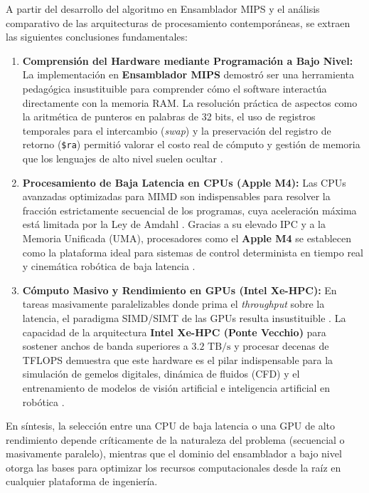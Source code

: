 \documentclass[12pt,a4paper]{article}
\begin{document}
A partir del desarrollo del algoritmo en Ensamblador MIPS y el análisis comparativo de las arquitecturas de procesamiento contemporáneas, se extraen las siguientes conclusiones fundamentales:

\begin{enumerate}[leftmargin=*]
    \item \textbf{Comprensión del Hardware mediante Programación a Bajo Nivel:} La implementación en \textbf{Ensamblador MIPS} demostró ser una herramienta pedagógica insustituible para comprender cómo el software interactúa directamente con la memoria RAM. La resolución práctica de aspectos como la aritmética de punteros en palabras de 32 bits, el uso de registros temporales para el intercambio (\textit{swap}) y la preservación del registro de retorno (\texttt{\$ra}) permitió valorar el costo real de cómputo y gestión de memoria que los lenguajes de alto nivel suelen ocultar \cite{patterson, mars}.

    \item \textbf{Procesamiento de Baja Latencia en CPUs (Apple M4):} Las CPUs avanzadas optimizadas para MIMD son indispensables para resolver la fracción estrictamente secuencial de los programas, cuya aceleración máxima está limitada por la Ley de Amdahl \cite{amdahl}. Gracias a su elevado IPC y a la Memoria Unificada (UMA), procesadores como el \textbf{Apple M4} se establecen como la plataforma ideal para sistemas de control determinista en tiempo real y cinemática robótica de baja latencia \cite{apple_m4}.

    \item \textbf{Cómputo Masivo y Rendimiento en GPUs (Intel Xe-HPC):} En tareas masivamente paralelizables donde prima el \textit{throughput} sobre la latencia, el paradigma SIMD/SIMT de las GPUs resulta insustituible \cite{flynn}. La capacidad de la arquitectura \textbf{Intel Xe-HPC (Ponte Vecchio)} para sostener anchos de banda superiores a $3.2\text{ TB/s}$ y procesar decenas de TFLOPS demuestra que este hardware es el pilar indispensable para la simulación de gemelos digitales, dinámica de fluidos (CFD) y el entrenamiento de modelos de visión artificial e inteligencia artificial en robótica \cite{intel_pontevecchio}.
\end{enumerate}

En síntesis, la selección entre una CPU de baja latencia o una GPU de alto rendimiento depende críticamente de la naturaleza del problema (secuencial o masivamente paralelo), mientras que el dominio del ensamblador a bajo nivel otorga las bases para optimizar los recursos computacionales desde la raíz en cualquier plataforma de ingeniería.
\end{document}
